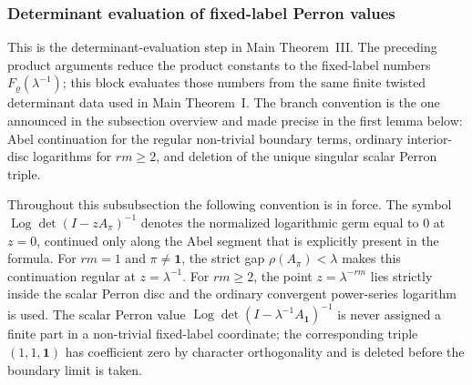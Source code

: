 \documentclass[11pt,a4paper]{amsart}
\theoremstyle{plain}
\theoremstyle{definition}
\theoremstyle{remark}
\DeclareMathOperator{\Log}{Log}
\begin{document}
\subsubsection{Determinant evaluation of fixed-label Perron values}
\label{subsubsec:determinant-only-fixed-label-values}

This is the determinant-evaluation step in Main Theorem~III.  The preceding
product arguments reduce the product constants to the fixed-label numbers
\(F_\varrho(\lambda^{-1})\); this block evaluates those numbers from the same
finite twisted determinant data used in Main Theorem~I.  The branch convention
is the one announced in the subsection overview and made precise in the first
lemma below: Abel continuation for the regular non-trivial boundary terms,
ordinary interior-disc logarithms for \(rm\ge2\), and deletion of the unique
singular scalar Perron triple.

Throughout this subsubsection the following convention is in force.  The
symbol \(\Log\det(I-zA_\pi)^{-1}\) denotes the normalized logarithmic germ
equal to \(0\) at \(z=0\), continued only along the Abel segment that is
explicitly present in the formula.  For \(rm=1\) and \(\pi\ne\mathbf1\), the
strict gap \(\rho(A_\pi)<\lambda\) makes this continuation regular at
\(z=\lambda^{-1}\).  For \(rm\ge2\), the point
\(z=\lambda^{-rm}\) lies strictly inside the scalar Perron disc and the
ordinary convergent power-series logarithm is used.  The scalar Perron value
\(\Log\det(I-\lambda^{-1}A_{\mathbf1})^{-1}\) is never assigned a finite part
in a non-trivial fixed-label coordinate; the corresponding triple
\((1,1,\mathbf1)\) has coefficient zero by character orthogonality and is
deleted before the boundary limit is taken.
\end{document}
